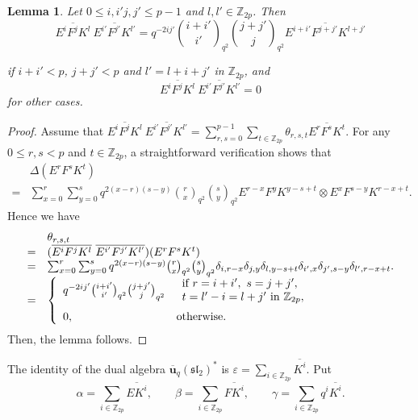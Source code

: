 \documentclass[10pt,oneside]{amsart}
\newcommand{\uq}{\mathbf{\overline{u}}_q(\mathfrak{sl_2})}
\newtheorem{lemma}[proposition]{Lemma}
\theoremstyle{definition}
\def\<{\leqslant}
\def\ot{\otimes}
\begin{document}
\begin{lemma}\label{2.1} Let $0\<i,i'j,j'\<p-1$ and $l,l'\in \mathbb{Z}_{2p}$.
Then
$$\overline{E^iF^jK^l}\ \overline{ E^{i'}F^{j'}K^{l'}}=
q^{-2ij'}\binom{i+i'}{i'}_{q^2}\binom{j+j'}{j}_{q^2}\overline{E^{i+i'}F^{j+j'}K^{l+j'}}$$

if $i+i'<p$, $j+j'<p$ and $l'=l+i+j'$ in $\mathbb{Z}_{2p}$, and
$$\overline{E^iF^jK^l}\ \overline{ E^{i'}F^{j'}K^{l'}}=0$$ for other cases.
\end{lemma}
\begin{proof} Assume that $\overline{E^iF^jK^l}\ \overline{ E^{i'}F^{j'}K^{l'}}=\sum_{r,s=0}^{p-1}\sum_{t\in\mathbb{Z}_{2p}} \theta_{r,s,t}\overline{E^rF^sK^t}.$
For any $0\<r,s<p$ and $t\in \mathbb{Z}_{2p}$, a straightforward verification shows that
$$\begin{array}{rl}
&\Delta(E^rF^sK^t)\\
=&\sum_{x=0}^r\sum_{y=0}^sq^{2(x-r)(s-y)}\binom{r}{x}_{q^2}
\binom{s}{y}_{q^2}E^{r-x}F^{y}K^{y-s+t}\ot E^{x}F^{s-y}K^{r-x+t}.
\end{array}$$
Hence we have $$\begin{array}{rl}
&\theta_{r,s,t}\\
=&(\overline{E^iF^jK^l}\ \overline{ E^{i'}F^{j'}K^{l'}})(E^rF^sK^t)\\
=&\sum_{x=0}^r\sum_{y=0}^sq^{2(x-r)(s-y)}\binom{r}{x}_{q^2}\binom{s}{y}_{q^2}\delta_{i,r-x}\delta_{j,y}
\delta_{l,y-s+t}\delta_{i',x}\delta_{j',s-y}\delta_{l',r-x+t}.\\
=&\left\{
\begin{array}{ll}
\vspace{0.2cm}
q^{-2ij'}\binom{i+i'}{i'}_{q^2}\binom{j+j'}{j}_{q^2}& \begin{array}{l}\text{if }r=i+i',\ s=j+j',\\ t=l'-i=l+j'\text{ in }\mathbb Z_{2p},\end{array}\\
0, & {\rm otherwise}.\\
\end{array}\right.
\end{array}$$
Then, the lemma follows.
\end{proof}

The identity of the dual algebra $\uq^*$ is
 $\varepsilon=\sum_{i\in\mathbb Z_{2p}}\overline{K^i}.$
Put
\[
 \alpha=\sum_{i\in\mathbb Z_{2p}}\overline{EK^i},\qquad
 \beta=\sum_{i\in\mathbb Z_{2p}}\overline{FK^i},\qquad
 \gamma=\sum_{i\in\mathbb Z_{2p}}q^i\overline{K^i}.
\]
\end{document}
